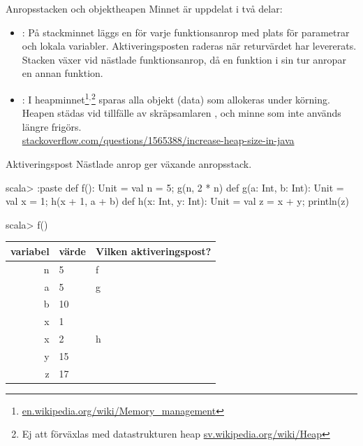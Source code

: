 \begin{Slide}{Anropsstacken och objektheapen}\SlideFontSmall
Minnet är uppdelat i två delar:
\begin{itemize}
\item {}: På stackminnet läggs en   för varje funktionsanrop med plats för parametrar och lokala variabler. Aktiveringsposten raderas när returvärdet har levererats. Stacken växer vid nästlade funktionsanrop, då en funktion i sin tur anropar en annan funktion. 

\item {}: I heapminnet\footnote{\href{https://en.wikipedia.org/wiki/Memory_management}{en.wikipedia.org/wiki/Memory\_management}}$^{,}$\footnote{Ej att förväxlas med datastrukturen heap  \href{https://sv.wikipedia.org/wiki/Heap}{sv.wikipedia.org/wiki/Heap}} sparas alla objekt (data) som allokeras under körning. Heapen städas vid tillfälle av skräpsamlaren , och minne som inte används längre frigörs. \\\vspace{0.5em}
\href{http://stackoverflow.com/questions/1565388/increase-heap-size-in-java}{stackoverflow.com/questions/1565388/increase-heap-size-in-java}
\end{itemize}
\end{Slide} 


\begin{Slide}{Aktiveringspost}\SlideFontSmall
Nästlade anrop ger växande anropsstack.
\begin{REPL}
scala> :paste
def f(): Unit = { val n = 5; g(n, 2 * n) }
def g(a: Int, b: Int): Unit = { val x = 1; h(x + 1, a + b) }
def h(x: Int, y: Int): Unit = { val z = x + y; println(z) }

scala> f()

\end{REPL}

\pause
{}

\begin{tabular}{|r | l | l |} \hline

variabel & värde & Vilken aktiveringspost? \\ \hline \hline
\pause
 n & 5 & f \\ \hline
 \pause 
 a & 5 & g \\
 b & 10 &  \\
 x & 1  &  \\  \hline
 \pause 
 x & 2  & h \\
 y & 15 &  \\
 z & 17 & \\ \hline
\end{tabular}
\end{Slide} 


